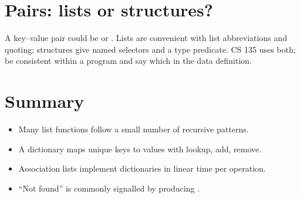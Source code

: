 \section{Pairs: lists or structures?}
A key--value pair could be  or .
Lists are convenient with list abbreviations and quoting; structures give
named selectors and a type predicate. CS 135 uses both; be consistent within a
program and say which in the data definition.

\section{Summary}
\begin{itemize}
  \item Many list functions follow a small number of recursive patterns.
  \item A dictionary maps unique keys to values with lookup, add, remove.
  \item Association lists implement dictionaries in linear time per operation.
  \item ``Not found'' is commonly signalled by producing .
\end{itemize}
